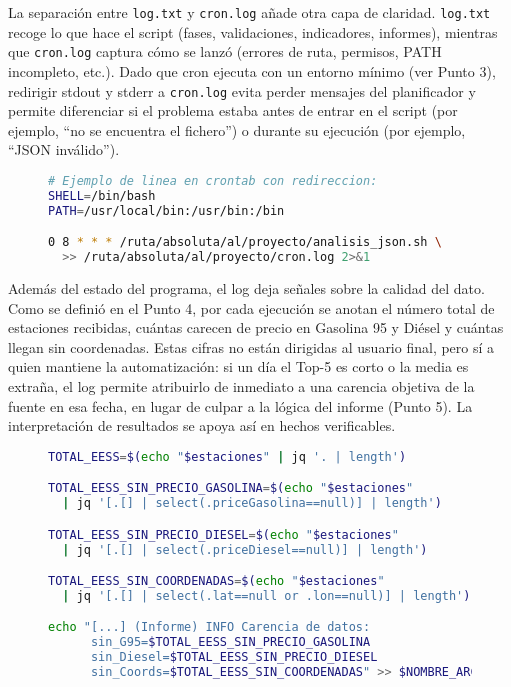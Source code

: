 La separación entre \texttt{log.txt} y \texttt{cron.log} añade otra capa de claridad. \texttt{log.txt} recoge lo que hace el script (fases, validaciones, indicadores, informes), mientras que \texttt{cron.log} captura cómo se lanzó (errores de ruta, permisos, PATH incompleto, etc.). Dado que cron ejecuta con un entorno mínimo (ver Punto 3), redirigir stdout y stderr a \texttt{cron.log} evita perder mensajes del planificador y permite diferenciar si el problema estaba antes de entrar en el script (por ejemplo, ``no se encuentra el fichero'') o durante su ejecución (por ejemplo, ``JSON inválido'').

\begin{figure}[H]
  \begin{lstlisting}[language=bash, caption={Figura 6.4 — Redirección de cron a cron.log}]
# Ejemplo de linea en crontab con redireccion:
SHELL=/bin/bash
PATH=/usr/local/bin:/usr/bin:/bin

0 8 * * * /ruta/absoluta/al/proyecto/analisis_json.sh \
  >> /ruta/absoluta/al/proyecto/cron.log 2>&1
\end{lstlisting}
\end{figure}

Además del estado del programa, el log deja señales sobre la calidad del dato. Como se definió en el Punto 4, por cada ejecución se anotan el número total de estaciones recibidas, cuántas carecen de precio en Gasolina 95 y Diésel y cuántas llegan sin coordenadas. Estas cifras no están dirigidas al usuario final, pero sí a quien mantiene la automatización: si un día el Top-5 es corto o la media es extraña, el log permite atribuirlo de inmediato a una carencia objetiva de la fuente en esa fecha, en lugar de culpar a la lógica del informe (Punto 5). La interpretación de resultados se apoya así en hechos verificables.

\begin{figure}[H]
  \begin{lstlisting}[language=bash, caption={Figura 6.5 — Señales de calidad de datos en el log}]
TOTAL_EESS=$(echo "$estaciones" | jq '. | length')

TOTAL_EESS_SIN_PRECIO_GASOLINA=$(echo "$estaciones" 
  | jq '[.[] | select(.priceGasolina==null)] | length')

TOTAL_EESS_SIN_PRECIO_DIESEL=$(echo "$estaciones" 
  | jq '[.[] | select(.priceDiesel==null)] | length')

TOTAL_EESS_SIN_COORDENADAS=$(echo "$estaciones" 
  | jq '[.[] | select(.lat==null or .lon==null)] | length')

echo "[...] (Informe) INFO Carencia de datos: 
      sin_G95=$TOTAL_EESS_SIN_PRECIO_GASOLINA 
      sin_Diesel=$TOTAL_EESS_SIN_PRECIO_DIESEL 
      sin_Coords=$TOTAL_EESS_SIN_COORDENADAS" >> $NOMBRE_ARCHIVO_LOG
\end{lstlisting}
\end{figure}

